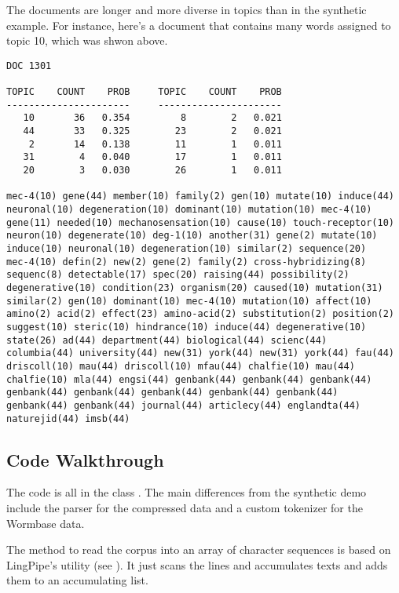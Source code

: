 The documents are longer and more diverse in topics than in the synthetic
example.  For instance, here's a document that contains many words assigned
to topic 10, which was shwon above.
%
{\small
\begin{verbatim}
DOC 1301

TOPIC    COUNT    PROB     TOPIC    COUNT    PROB
----------------------     ----------------------
   10       36   0.354         8        2   0.021
   44       33   0.325        23        2   0.021
    2       14   0.138        11        1   0.011
   31        4   0.040        17        1   0.011
   20        3   0.030        26        1   0.011

mec-4(10) gene(44) member(10) family(2) gen(10) mutate(10) induce(44)
neuronal(10) degeneration(10) dominant(10) mutation(10) mec-4(10)
gene(11) needed(10) mechanosensation(10) cause(10) touch-receptor(10)
neuron(10) degenerate(10) deg-1(10) another(31) gene(2) mutate(10)
induce(10) neuronal(10) degeneration(10) similar(2) sequence(20)
mec-4(10) defin(2) new(2) gene(2) family(2) cross-hybridizing(8)
sequenc(8) detectable(17) spec(20) raising(44) possibility(2)
degenerative(10) condition(23) organism(20) caused(10) mutation(31)
similar(2) gen(10) dominant(10) mec-4(10) mutation(10) affect(10)
amino(2) acid(2) effect(23) amino-acid(2) substitution(2) position(2)
suggest(10) steric(10) hindrance(10) induce(44) degenerative(10)
state(26) ad(44) department(44) biological(44) scienc(44)
columbia(44) university(44) new(31) york(44) new(31) york(44) fau(44)
driscoll(10) mau(44) driscoll(10) mfau(44) chalfie(10) mau(44)
chalfie(10) mla(44) engsi(44) genbank(44) genbank(44) genbank(44)
genbank(44) genbank(44) genbank(44) genbank(44) genbank(44)
genbank(44) genbank(44) journal(44) articlecy(44) englandta(44)
naturejid(44) imsb(44)
\end{verbatim}}

\subsection{Code Walkthrough}\label{section:lda-worm-code}

The code is all in the class .  The main differences
from the synthetic demo include the parser for the compressed data and
a custom tokenizer for the Wormbase data.  

The method to read the corpus into an array of character sequences is
based on LingPipe's  utility (see
).  It just scans the lines and
accumulates texts and adds them to an accumulating list.

